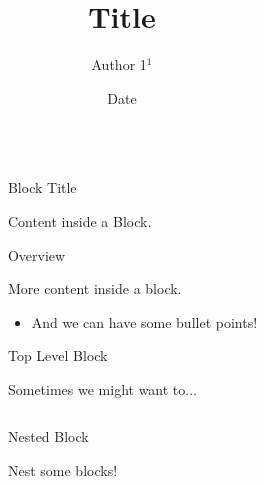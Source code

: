\documentclass[table]{beamer}
\title{\Huge Title}
\author[]{\large Author 1$^{1}$}
\institute[]
{
	$^{1}$ Department of Electrical \& Computer Engineering, The University of Auckland
}
\date{
	Date
}
\newlength{\columnheight}
\begin{document}
	\begin{frame}{}
		
		\vspace{1cm}
		
		\begin{columns}[t]
			\begin{column}{0.02\paperwidth}
			\end{column}
			
			\begin{column}{0.46\paperwidth}
				\parbox[t][\columnheight]{\textwidth}{
				
					\begin{block}{Block Title}
						\setlength{\rightskip}{0pt plus 200pt}
						
						Content inside a Block.
					\end{block}
				
					\vspace{1cm}
					
					\begin{block}{Overview}
						\setlength{\rightskip}{0pt plus 200pt}
						
						More content inside a block.
						
						\begin{itemize}
							\item And we can have some bullet points!
						\end{itemize}
					\end{block}
				
					\vspace{1cm}
					
					\begin{block}{Top Level Block}
						\setlength{\rightskip}{0pt plus 200pt}
						
						Sometimes we might want to...
						
						\vspace{1cm}
						
						\begin{columns}[c]
							\begin{column}{0.95\textwidth}
								\begin{block}{Nested Block}
									\setlength{\rightskip}{0pt plus 200pt}
									
									Nest some blocks!
								\end{block}
							\end{column}
						\end{columns}
					\end{block}
				}
			\end{column}
			

\end{columns}
\end{frame}
\end{document}
